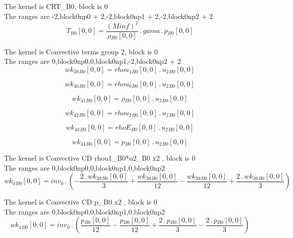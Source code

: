 \documentclass{article}
\begin{document}
\noindent The kernel is CRT_B0, block is 0\\\noindent The ranges are -2,block0np0 + 2,-2,block0np1 + 2,-2,block0np2 + 2\\\begin{dmath}{T{_{B0}}}[{0,0}] = \frac{\left(Minf \right)^{2}}{{\rho{_{B0}}}[{0,0}]} \,.\, gama \,.\, {p{_{B0}}}[{0,0}]\end{dmath}

\noindent The kernel is Convective terms group 2, block is 0\\\noindent The ranges are 0,block0np0,0,block0np1,-2,block0np2 + 2\\\begin{dmath}{wk_{39}{_{B0}}}[{0,0}] = {rhou_{1}{_{B0}}}[{0,0}] \,.\, {u_{2}{_{B0}}}[{0,0}]\end{dmath}

\begin{dmath}{wk_{40}{_{B0}}}[{0,0}] = {rhou_{0}{_{B0}}}[{0,0}] \,.\, {u_{2}{_{B0}}}[{0,0}]\end{dmath}

\begin{dmath}{wk_{41}{_{B0}}}[{0,0}] = {\rho{_{B0}}}[{0,0}] \,.\, {u_{2}{_{B0}}}[{0,0}]\end{dmath}

\begin{dmath}{wk_{42}{_{B0}}}[{0,0}] = {rhou_{2}{_{B0}}}[{0,0}] \,.\, {u_{2}{_{B0}}}[{0,0}]\end{dmath}

\begin{dmath}{wk_{43}{_{B0}}}[{0,0}] = {rhoE{_{B0}}}[{0,0}] \,.\, {u_{2}{_{B0}}}[{0,0}]\end{dmath}

\begin{dmath}{wk_{44}{_{B0}}}[{0,0}] = {p{_{B0}}}[{0,0}] \,.\, {u_{2}{_{B0}}}[{0,0}]\end{dmath}

\noindent The kernel is Convective CD rhou1_B0*u2_B0 x2 , block is 0\\\noindent The ranges are 0,block0np0,0,block0np1,0,block0np2\\\begin{dmath}{wk_{0}{_{B0}}}[{0,0}] = inv_0 \,.\, \left(- \frac{2 \,.\, {wk_{39}{_{B0}}}[{0,0}]}{3} + \frac{{wk_{39}{_{B0}}}[{0,0}]}{12} - \frac{{wk_{39}{_{B0}}}[{0,0}]}{12} + \frac{2 \,.\, {wk_{39}{_{B0}}}[{0,0}]}{3}\right)\end{dmath}

\noindent The kernel is Convective CD p_B0 x2 , block is 0\\\noindent The ranges are 0,block0np0,0,block0np1,0,block0np2\\\begin{dmath}{wk_{1}{_{B0}}}[{0,0}] = inv_0 \,.\, \left(\frac{{p{_{B0}}}[{0,0}]}{12} - \frac{{p{_{B0}}}[{0,0}]}{12} + \frac{2 \,.\, {p{_{B0}}}[{0,0}]}{3} - \frac{2 \,.\, {p{_{B0}}}[{0,0}]}{3}\right)\end{dmath}
\end{document}
